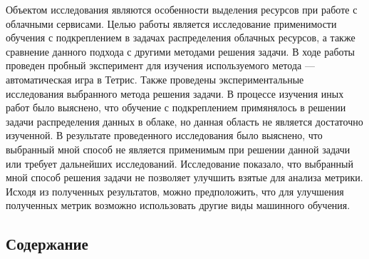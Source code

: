 \documentclass{article}
\begin{document}
\bigskip
Объектом исследования являются особенности выделения ресурсов при работе с облачными сервисами.
\bigskip
Целью работы является исследование применимости обучения с подкреплением в задачах распределения облачных ресурсов, а также сравнение данного подхода с другими методами решения задачи. 
\bigskip
В ходе работы проведен пробный эксперимент для изучения используемого метода — автоматическая игра в Тетрис. Также проведены экспериментальные исследования выбранного метода решения задачи.
\bigskip
В процессе изучения иных работ было выяснено, что обучение с подкреплением примянялось в решении задачи распределения данных в облаке, но данная область не является достаточно изученной.
\bigskip
В результате проведенного исследования было выяснено, что выбранный мной способ не является применимым при решении данной задачи или требует дальнейших исследований.
\bigskip
Исследование показало, что выбранный мной способ решения задачи не позволяет улучшить взятые для анализа метрики.\\
\bigskip
Исходя из полученных результатов, можно предположить, что для улучшения полученных метрик возможно использовать другие виды машинного обучения.
\newpage
\begin{center}
\section {Содержание}
\tableofcontents
\end{center}
\newpage
\end{document}
